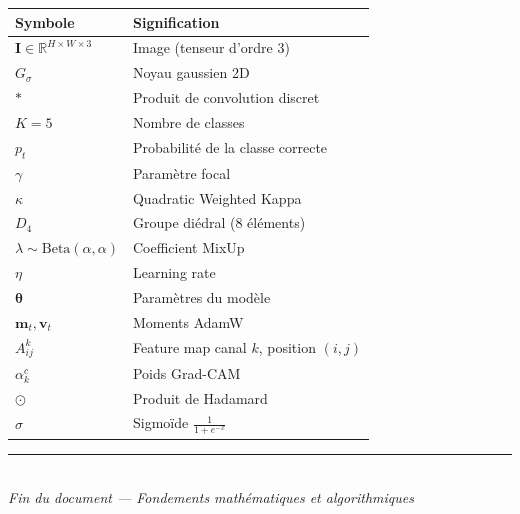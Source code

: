 \documentclass[11pt,a4paper]{article}
\newcommand{\R}{\mathbb{R}}
\begin{document}
\begin{center}
\renewcommand{\arraystretch}{1.3}
\begin{tabularx}{\textwidth}{lX}
\toprule
\textbf{Symbole} & \textbf{Signification} \\
\midrule
$\mathbf{I} \in \R^{H \times W \times 3}$ & Image (tenseur d'ordre 3) \\
$G_\sigma$ & Noyau gaussien 2D \\
$*$ & Produit de convolution discret \\
$K=5$ & Nombre de classes \\
$p_t$ & Probabilit\'e de la classe correcte \\
$\gamma$ & Param\`etre focal \\
$\kappa$ & Quadratic Weighted Kappa \\
$D_4$ & Groupe di\'edral (8 \'el\'ements) \\
$\lambda \sim \text{Beta}(\alpha,\alpha)$ & Coefficient MixUp \\
$\eta$ & Learning rate \\
$\bm{\theta}$ & Param\`etres du mod\`ele \\
$\mathbf{m}_t, \mathbf{v}_t$ & Moments AdamW \\
$A^k_{ij}$ & Feature map canal $k$, position $(i,j)$ \\
$\alpha_k^c$ & Poids Grad-CAM \\
$\odot$ & Produit de Hadamard \\
$\sigma$ & Sigmo\"ide $\frac{1}{1+e^{-x}}$ \\
\bottomrule
\end{tabularx}
\end{center}

\vfill
\begin{center}
\textcolor{accent}{\rule{0.5\textwidth}{0.5pt}}\\[0.5em]
\textit{Fin du document --- Fondements math\'ematiques et algorithmiques}
\end{center}
\end{document}
